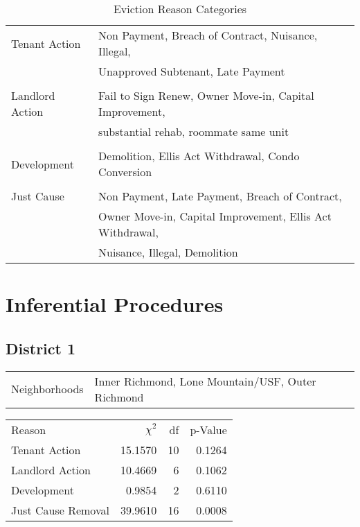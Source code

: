 \documentclass[]{article}
\begin{document}
\begin{table}[!h]
\begin{tabular}{l | l}

	Tenant Action    	& Non Payment, Breach of Contract, Nuisance, Illegal, 	  \\
						& Unapproved Subtenant, Late Payment			    	  \\\\
	Landlord Action     & Fail to Sign Renew, Owner Move-in, Capital Improvement, \\ 
						& substantial rehab, roommate same unit 				  \\\\
	Development    		& Demolition, Ellis Act Withdrawal, Condo Conversion      \\\\  
	Just Cause    		& Non Payment, Late Payment, Breach of Contract, 		  \\ 
						& Owner Move-in, Capital Improvement, Ellis Act Withdrawal, \\ 
						& Nuisance, Illegal, Demolition 						  \\	
	\end{tabular}
\caption{Eviction Reason Categories}
\end{table}

\section{Inferential Procedures}
\subsection{District 1}

\begin{table}[!h]
\centering
\begin{tabular}{l | l}
Neighborhoods & Inner Richmond, Lone Mountain/USF, Outer Richmond \\
\end{tabular}
\end{table}
\FloatBarrier

\begin {table}[!h]
\centering
\begin{tabular}{l | r | r | r}
	
	Reason	&  $\chi ^{2}$ & df & p-Value \\
	Tenant Action 		   &  15.1570  & 10  & 0.1264  \\
	Landlord Action	       &  10.4669  & 6   & 0.1062 \\
	Development			   &  0.9854   & 2   & 0.6110 \\
	Just Cause Removal	   &  39.9610  & 16  & 0.0008 \\
\end{tabular} \newline
\end{table}
\FloatBarrier
\end{document}
